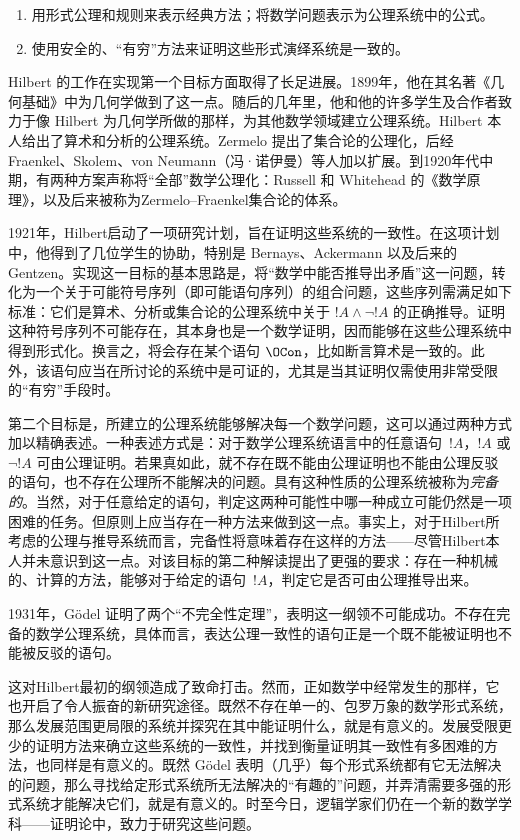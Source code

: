 \documentclass[../../../include/open-logic-section]{subfiles}
\begin{document}
\begin{enumerate}
\item 用形式公理和规则来表示经典方法；将数学问题表示为公理系统中的公式。
\item 使用安全的、“有穷”方法来证明这些形式演绎系统是一致的。
\end{enumerate}

Hilbert 的工作在实现第一个目标方面取得了长足进展。1899年，他在其名著《几何基础》中为几何学做到了这一点。随后的几年里，他和他的许多学生及合作者致力于像 Hilbert 为几何学所做的那样，为其他数学领域建立公理系统。Hilbert 本人给出了算术和分析的公理系统。Zermelo 提出了集合论的公理化，后经 Fraenkel、Skolem、von Neumann（冯·诺伊曼）等人加以扩展。到1920年代中期，有两种方案声称将“全部”数学公理化：Russell 和 Whitehead 的《数学原理》，以及后来被称为Zermelo--Fraenkel集合论的体系。

1921年，Hilbert启动了一项研究计划，旨在证明这些系统的一致性。在这项计划中，他得到了几位学生的协助，特别是 Bernays、Ackermann 以及后来的 Gentzen。实现这一目标的基本思路是，将“数学中能否推导出矛盾”这一问题，转化为一个关于可能符号序列（即可能语句序列）的组合问题，这些序列需满足如下标准：它们是算术、分析或集合论的公理系统中关于 $!A \land \lnot !A$ 的正确推导。证明这种符号序列不可能存在，其本身也是一个数学证明，因而能够在这些公理系统中得到形式化。换言之，将会存在某个语句 $\OCon$，比如断言算术是一致的。此外，该语句应当在所讨论的系统中是可证的，尤其是当其证明仅需使用非常受限的“有穷”手段时。

第二个目标是，所建立的公理系统能够解决每一个数学问题，这可以通过两种方式加以精确表述。一种表述方式是：对于数学公理系统语言中的任意语句~$!A$，$!A$ 或 $\lnot !A$ 可由公理证明。若果真如此，就不存在既不能由公理证明也不能由公理反驳的语句，也不存在公理所不能解决的问题。具有这种性质的公理系统被称为\emph{完备的}。当然，对于任意给定的语句，判定这两种可能性中哪一种成立可能仍然是一项困难的任务。但原则上应当存在一种方法来做到这一点。事实上，对于Hilbert所考虑的公理与推导系统而言，完备性将意味着存在这样的方法——尽管Hilbert本人并未意识到这一点。对该目标的第二种解读提出了更强的要求：存在一种机械的、计算的方法，能够对于给定的语句~$!A$，判定它是否可由公理推导出来。

1931年，Gödel 证明了两个“不完全性定理”，表明这一纲领不可能成功。不存在完备的数学公理系统，具体而言，表达公理一致性的语句正是一个既不能被证明也不能被反驳的语句。

这对Hilbert最初的纲领造成了致命打击。然而，正如数学中经常发生的那样，它也开启了令人振奋的新研究途径。既然不存在单一的、包罗万象的数学形式系统，那么发展范围更局限的系统并探究在其中能证明什么，就是有意义的。发展受限更少的证明方法来确立这些系统的一致性，并找到衡量证明其一致性有多困难的方法，也同样是有意义的。既然 Gödel 表明（几乎）每个形式系统都有它无法解决的问题，那么寻找给定形式系统所无法解决的“有趣的”问题，并弄清需要多强的形式系统才能解决它们，就是有意义的。时至今日，逻辑学家们仍在一个新的数学学科——证明论中，致力于研究这些问题。
\end{document}
